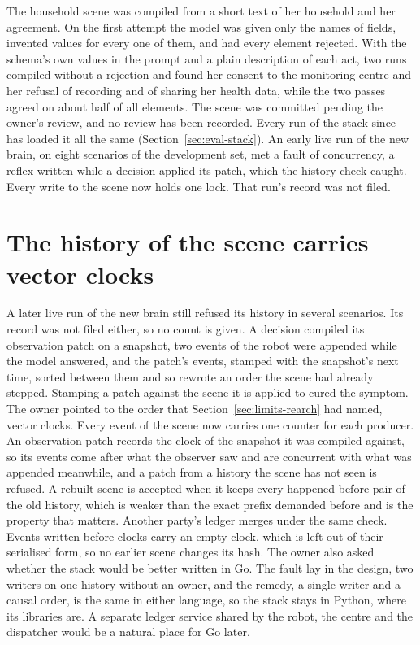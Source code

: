 The household scene was compiled from a short text of her household and her agreement.
On the first attempt the model was given only the names of fields, invented values for every one of
them, and had every element rejected.
With the schema's own values in the prompt and a plain description of each act, two runs compiled
without a rejection and found her consent to the monitoring centre and her refusal of recording and
of sharing her health data, while the two passes agreed on about half of all elements.
The scene was committed pending the owner's review, and no review has been recorded.
Every run of the stack since has loaded it all the same (Section~\ref{sec:eval-stack}).
An early live run of the new brain, on eight scenarios of the development set, met a fault of
concurrency, a reflex written while a decision applied its patch, which the history check caught.
Every write to the scene now holds one lock.
That run's record was not filed.

\section{The history of the scene carries vector clocks}\label{sec:log-clocks}

A later live run of the new brain still refused its history in several scenarios.
Its record was not filed either, so no count is given.
A decision compiled its observation patch on a snapshot, two events of the robot were appended while
the model answered, and the patch's events, stamped with the snapshot's next time, sorted between
them and so rewrote an order the scene had already stepped.
Stamping a patch against the scene it is applied to cured the symptom.
The owner pointed to the order that Section~\ref{sec:limits-rearch} had named, vector clocks.
Every event of the scene now carries one counter for each producer.
An observation patch records the clock of the snapshot it was compiled against, so its events come
after what the observer saw and are concurrent with what was appended meanwhile, and a patch from a
history the scene has not seen is refused.
A rebuilt scene is accepted when it keeps every happened-before pair of the old history, which is
weaker than the exact prefix demanded before and is the property that matters.
Another party's ledger merges under the same check.
Events written before clocks carry an empty clock, which is left out of their serialised form, so
no earlier scene changes its hash.
The owner also asked whether the stack would be better written in Go.
The fault lay in the design, two writers on one history without an owner, and the remedy, a single
writer and a causal order, is the same in either language, so the stack stays in Python, where its
libraries are.
A separate ledger service shared by the robot, the centre and the dispatcher would be a natural
place for Go later.

